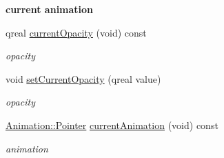 \begin{Indent}\textbf{ current animation}\par
\begin{DoxyCompactItemize}
\item 
\mbox{\label{class_mdi_window_data_aebc6b5dd28d90b01b6c638b55532bd66}} 
qreal \hyperlink{class_mdi_window_data_aebc6b5dd28d90b01b6c638b55532bd66}{current\+Opacity} (void) const
\begin{DoxyCompactList}\small\item\em opacity \end{DoxyCompactList}\item 
\mbox{\label{class_mdi_window_data_a98929f75da2b6c142bda9a82d78286d0}} 
void \hyperlink{class_mdi_window_data_a98929f75da2b6c142bda9a82d78286d0}{set\+Current\+Opacity} (qreal value)
\begin{DoxyCompactList}\small\item\em opacity \end{DoxyCompactList}\item 
\mbox{\label{class_mdi_window_data_a74d496640ec609e23e760864820888e5}} 
\hyperlink{class_animation_ac48a8d074abd43dc3f6485353ba24e30}{Animation\+::\+Pointer} \hyperlink{class_mdi_window_data_a74d496640ec609e23e760864820888e5}{current\+Animation} (void) const
\begin{DoxyCompactList}\small\item\em animation \end{DoxyCompactList}\end{DoxyCompactItemize}
\end{Indent}
